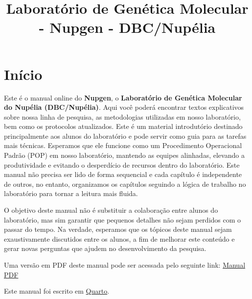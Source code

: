 \documentclass[
  letterpaper,
  DIV=11,
  numbers=noendperiod]{scrreprt}
\title{Laboratório de Genética Molecular - Nupgen - DBC/Nupélia}
\author{}
\date{}
\renewcommand*\contentsname{Índice}
\newcommand\contentsname{Índice}
\begin{document}
\maketitle
\ifdefined\Shaded\renewenvironment{Shaded}{\begin{tcolorbox}[boxrule=0pt, borderline west={3pt}{0pt}{shadecolor}, sharp corners, interior hidden, frame hidden, breakable, enhanced]}{\end{tcolorbox}}\fi

\renewcommand*\contentsname{Índice}
{
\hypersetup{linkcolor=}
\setcounter{tocdepth}{2}
\tableofcontents
}

\hypertarget{inuxedcio}{%
\chapter*{Início}\label{inuxedcio}}


Este é o manual online do \textbf{Nupgen}, o \textbf{Laboratório de
Genética Molecular do Nupélia (DBC/Nupélia)}. Aqui você poderá encontrar
textos explicativos sobre nossa linha de pesquisa, as metodologias
utilizadas em nosso laboratório, bem como os protocolos atualizados.
Este é um material introdutório destinado principalmente aos alunos do
laboratório e pode servir como guia para as tarefas mais técnicas.
Esperamos que ele funcione como um Procedimento Operacional Padrão (POP)
em nosso laboratório, mantendo as equipes alinhadas, elevando a
produtividade e evitando o desperdício de recursos dentro do
laboratório. Este manual não precisa ser lido de forma sequencial e cada
capítulo é independente de outros, no entanto, organizamos os capítulos
seguindo a lógica de trabalho no laboratório para tornar a leitura mais
fluida.

O objetivo deste manual não é substituir a colaboração entre alunos do
laboratório, mas sim garantir que pequenos detalhes não sejam perdidos
com o passar do tempo. Na verdade, esperamos que os tópicos deste manual
sejam exaustivamente discutidos entre os alunos, a fim de melhorar este
conteúdo e gerar novas perguntas que ajudem no desenvolvimento da
pesquisa.

Uma versão em PDF deste manual pode ser acessada pelo seguinte link:
\href{https://github.com/nupgen/book_nupgen/blob/master/_book/book-nupgen.pdf}{Manual
PDF}

Este manual foi escrito em \href{https://quarto.org/}{Quarto}.
\end{document}
